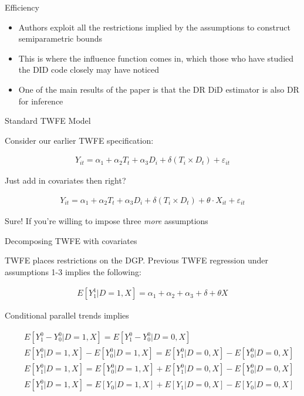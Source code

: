 \documentclass{beamer}
\begin{document}
\begin{frame}{Efficiency}

\begin{itemize}
\item Authors exploit all the restrictions implied by the assumptions to construct semiparametric bounds
\item This is where the influence function comes in, which those who have studied the DID code closely may have noticed
\item One of the main results of the paper is that the DR DiD estimator is also DR for inference
\end{itemize}

\end{frame}


\begin{frame}{Standard TWFE Model}

Consider our earlier TWFE specification:

\begin{eqnarray*}
Y_{it} = \alpha_1  + \alpha_2 T_t + \alpha_3 D_i +  \delta (T_i \times D_t)  + \varepsilon_{it}
\end{eqnarray*}

\bigskip

Just add in covariates then right?

\begin{eqnarray*}
Y_{it} = \alpha_1  + \alpha_2 T_t + \alpha_3 D_i  + \delta (T_i \times D_t) + \theta \cdot X_{it} + \varepsilon_{it}
\end{eqnarray*}

Sure! If you're willing to impose three \emph{more} assumptions

\end{frame}




\begin{frame}{Decomposing TWFE with covariates}

TWFE places restrictions on the DGP. Previous TWFE regression under assumptions 1-3 implies the following:

\bigskip

\begin{eqnarray*}
E[Y^1_1|D=1,X] = \alpha_1 + \alpha_2 + \alpha_3 + \delta + \theta X
\end{eqnarray*}

\bigskip

Conditional parallel trends implies

\small
\begin{eqnarray*}
&&E[Y^0_{1} - Y^0_{0}|D=1,X]= E[Y^0_{1} - Y^0_{0}|D=0,X] \\
&&E[Y^0_{1}|D=1,X] - E[Y^0_{0}|D=1,X]= E[Y^0_{1}|D=0,X] - E[Y^0_{0}|D=0,X] \\
&&E[Y^0_{1}|D=1,X] = E[Y^0_{0}|D=1,X] + E[Y^0_{1}|D=0,X] - E[Y^0_{0}|D=0,X] \\
&&E[Y^0_{1}|D=1,X] = E[Y_{0}|D=1,X] + E[Y_{1}|D=0,X] - E[Y_{0}|D=0,X] \\
\end{eqnarray*}


\end{frame}
\end{document}
